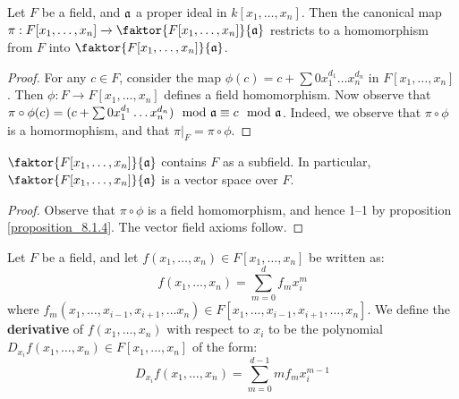 \begin{theorem}\label{theorem_8.8.2}
  Let $F$ be a field, and $\mathfrak{a}$ a proper ideal in $k[x_1, \dots,
  x_n]$. Then the canonical map $\pi:F[x_1, \dots, x_n] \xrightarrow{}
  \faktor{F[x_1, \dots, x_n]}{\af}$ restricts to a homomorphism from
  $F$ into $\faktor{F[x_1, \dots, x_n]}{\af}$.
\end{theorem}
\begin{proof}
  For any $c \in F$, consider the map $\phi(c)=c+\sum{0x_1^{d_1} \dots
  x_n^{d_n}}$ in $F[x_1, \dots, x_n]$. Then $\phi:F \xrightarrow{}
  F[x_1, \dots, x_n]$ defines a field homomorphism. Now observe that
  $\pi \circ \phi(c)=(c+\sum{0x_1^{d_1} \dots x_n^{d_n}}) \mod{\mathfrak{a}}
  \equiv c \mod{\mathfrak{a}}$. Indeed, we observe that $\pi \circ \phi$ is a
  homormophism, and that $\pi|_F=\pi \circ \phi$.
\end{proof}
\begin{corollary}
  $\faktor{F[x_1, \dots, x_n]}{\af}$ contains $F$ as a subfield. In
  particular, $\faktor{F[x_1, \dots, x_n]}{\af}$ is a vector space
  over $F$.
\end{corollary}
\begin{proof}
  Observe that $\pi \circ \phi$ is a field homomorphism, and hence
  1--1 by proposition \ref{proposition_8.1.4}. The vector field
  axioms follow.
\end{proof}

\begin{definition}
  Let $F$ be a field, and let $f(x_1, \dots ,x_n) \in F[x_1, \dots, x_n]$
  be written as:
  \begin{equation*}
    f(x_1, \dots, x_n)=\sum_{m=0}^d{f_mx_i^{m}}
  \end{equation*}
  where $f_m(x_1, \dots, x_{i-1},x_{i+1}, \dots x_n) \in F[x_1, \dots,
  x_{i-1},x_{i+1}, \dots, x_n]$. We define the \textbf{derivative} of
  $f(x_1, \dots, x_n)$ with respect to $x_i$ to be the polynomial
  $D_{x_i}{f(x_1, \dots, x_n)} \in F[x_1, \dots, x_n]$ of the form:
  \begin{equation*}
    D_{x_i}{f(x_1, \dots, x_n)}=\sum_{m=0}^{d-1}{mf_mx_i^{m-1}}
  \end{equation*}
\end{definition}

